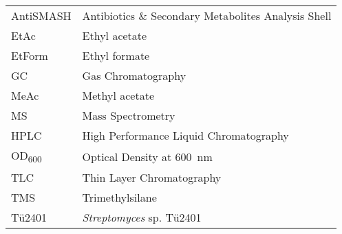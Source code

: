 
\begin{table}[htbp]
	\centering
	\begin{tabularx}{\textwidth}{>{\hsize=0.25\hsize}X>{\hsize=0.75\hsize}X}
		\toprule
		AntiSMASH	& Antibiotics \& Secondary Metabolites Analysis Shell	\\
		EtAc		& Ethyl acetate			\\
		EtForm		& Ethyl formate			\\
		GC			& Gas Chromatography	\\
		MeAc		& Methyl acetate		\\
		MS			& Mass Spectrometry		\\
		HPLC		& High Performance Liquid Chromatography		\\
		OD\textsubscript{600}	& Optical Density at \SI{600}{\nano\meter}	\\
		TLC			& Thin Layer Chromatography 	\\
		TMS 		& Trimethylsilane		\\
		Tü2401		& \textit{Streptomyces} sp. Tü2401		\\
		
		
		\bottomrule
	\end{tabularx}
\end{table}
